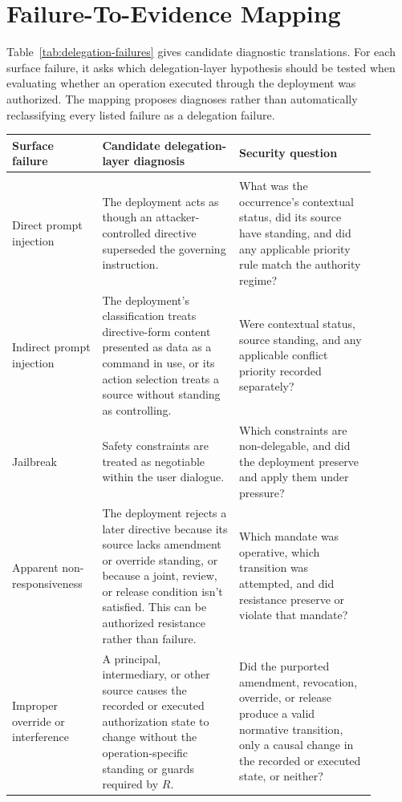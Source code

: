 \section{Failure-To-Evidence Mapping}

Table~\ref{tab:delegation-failures} gives candidate diagnostic translations. For each surface failure, it asks which delegation-layer hypothesis should be tested when evaluating whether an operation executed through the deployment was authorized. The mapping proposes diagnoses rather than automatically reclassifying every listed failure as a delegation failure.

\begin{table}[p]
\scriptsize
\renewcommand{\arraystretch}{0.92}
\centering
\begin{tabular}{>{\raggedright\arraybackslash}p{0.22\linewidth}%
                >{\raggedright\arraybackslash}p{0.34\linewidth}%
                >{\raggedright\arraybackslash}p{0.34\linewidth}}
\toprule
Surface failure & Candidate delegation-layer diagnosis & Security question \\
\midrule
\multicolumn{3}{l}{\textit{Instruction-status, standing, and priority failures}} \\
\midrule
Direct prompt injection & The deployment acts as though an attacker-controlled directive superseded the governing instruction. & What was the occurrence's contextual status, did its source have standing, and did any applicable priority rule match the authority regime? \\
Indirect prompt injection & The deployment's classification treats directive-form content presented as data as a command in use, or its action selection treats a source without standing as controlling. & Were contextual status, source standing, and any applicable conflict priority recorded separately? \\
Jailbreak & Safety constraints are treated as negotiable within the user dialogue. & Which constraints are non-delegable, and did the deployment preserve and apply them under pressure? \\
Apparent non-responsiveness & The deployment rejects a later directive because its source lacks amendment or override standing, or because a joint, review, or release condition isn't satisfied. This can be authorized resistance rather than failure. & Which mandate was operative, which transition was attempted, and did resistance preserve or violate that mandate? \\
Improper override or interference & A principal, intermediary, or other source causes the recorded or executed authorization state to change without the operation-specific standing or guards required by \(R\). & Did the purported amendment, revocation, override, or release produce a valid normative transition, only a causal change in the recorded or executed state, or neither? \\

\end{tabular}
\end{table}
